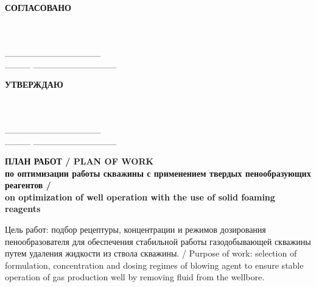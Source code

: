 \documentclass[11pt]{article}
\begin{document}
\noindent
\begin{minipage}[t]{0.48\textwidth}
\centering\textbf{СОГЛАСОВАНО}\\[0.3em]
\raggedright
{}\\
\\[0.8em]
\_\_\_\_\_\_\_\_\_\_\_\_\_\_\_ \\[0.5em]
\_\_\_\_ \_\_\_\_\_\_\_\_\_\_\_\_\_ 
\end{minipage}%
\hfill
\begin{minipage}[t]{0.48\textwidth}
\centering\textbf{УТВЕРЖДАЮ}\\[0.3em]
\raggedright
{}\\
\\[0.8em]
\_\_\_\_\_\_\_\_\_\_\_\_\_\_\_ \\[0.5em]
\_\_\_\_ \_\_\_\_\_\_\_\_\_\_\_\_\_ 
\end{minipage}

\vspace{1.2em}

\begin{center}
\textbf{\large ПЛАН РАБОТ / PLAN OF WORK}\\[0.4em]
\textbf{по оптимизации работы скважины  с применением твердых пенообразующих реагентов /\\
on optimization of well  operation with the use of solid foaming reagents}
\end{center}

\vspace{0.6em}

Цель работ: подбор рецептуры, концентрации и режимов дозирования пенообразователя для обеспечения стабильной работы газодобывающей скважины путем удаления жидкости из ствола скважины. / Purpose of work: selection of formulation, concentration and dosing regimes of blowing agent to ensure stable operation of gas production well by removing fluid from the wellbore.

\vspace{0.8em}
\end{document}

